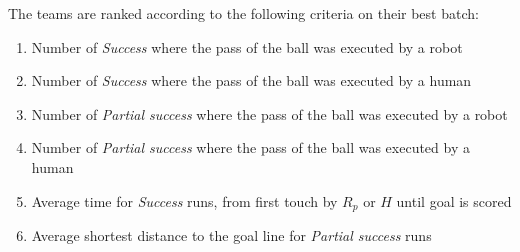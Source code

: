 The teams are ranked according to the following criteria on their best batch:
\begin{enumerate}
\item Number of \textit{Success} where the pass of the ball was executed by a robot
\item Number of \textit{Success} where the pass of the ball was executed by a human
\item Number of \textit{Partial success} where the pass of the ball was executed by a robot
\item Number of \textit{Partial success} where the pass of the ball was executed by a human
\item Average time for \textit{Success} runs, from first touch by $R_p$ or $H$ until goal is scored
\item Average shortest distance to the goal line for \textit{Partial success} runs
\end{enumerate}
